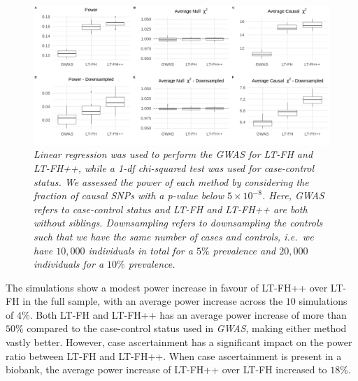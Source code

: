 \begin{figure}[h]
	\includegraphics[width=\textwidth]{results/boxplot_05prev_both.png}
	\caption[Simulation results for a $ 5\% $ prevalence, with and without downsampling of controls]{
		\sl Linear regression was used to perform the GWAS for LT-FH and LT-FH++, while a 1-df chi-squared test was used for case-control status. We assessed the power of each method by considering the fraction of causal SNPs with a p-value below $ 5 \times 10^{-8} $. Here, GWAS refers to case-control status and LT-FH and LT-FH++ are both without siblings. Downsampling refers to downsampling the controls such that we have the same number of cases and controls, i.e.\, we have $ 10,000 $ individuals in total for a $ 5\% $ prevalence and $ 20,000 $ individuals for a $ 10\% $ prevalence.}
	\label{fig:LTFHppSimulationResults}
\end{figure}

The simulations show a modest power increase in favour of LT-FH++ over LT-FH in the full sample, with an average power increase across the $ 10 $ simulations of $ 4\% $. Both LT-FH and LT-FH++ has an average power increase of more than $ 50\% $ compared to the case-control status used in \textit{GWAS}, making either method vastly better. However, case ascertainment has a significant impact on the power ratio between LT-FH and LT-FH++. When case ascertainment is present in a biobank, the average power increase of LT-FH++ over LT-FH increased to $ 18\% $.

\newpage


